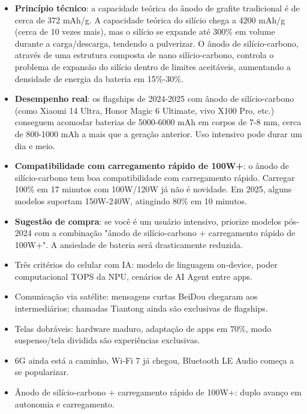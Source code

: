\begin{itemize}
  \item \textbf{Princípio técnico}: a capacidade teórica do ânodo de grafite tradicional é de cerca de 372 mAh/g. A capacidade teórica do silício chega a 4200 mAh/g (cerca de 10 vezes mais), mas o silício se expande até 300\% em volume durante a carga/descarga, tendendo a pulverizar. O ânodo de silício-carbono, através de uma estrutura composta de nano silício-carbono, controla o problema de expansão do silício dentro de limites aceitáveis, aumentando a densidade de energia da bateria em 15\%-30\%.
  \item \textbf{Desempenho real}: os flagships de 2024-2025 com ânodo de silício-carbono (como Xiaomi 14 Ultra, Honor Magic 6 Ultimate, vivo X100 Pro, etc.) conseguem acomodar baterias de 5000-6000 mAh em corpos de 7-8 mm, cerca de 800-1000 mAh a mais que a geração anterior. Uso intensivo pode durar um dia e meio.
  \item \textbf{Compatibilidade com carregamento rápido de 100W+}: o ânodo de silício-carbono tem boa compatibilidade com carregamento rápido. Carregar 100\% em 17 minutos com 100W/120W já não é novidade. Em 2025, alguns modelos suportam 150W-240W, atingindo 80\% em 10 minutos.
  \item \textbf{Sugestão de compra}: se você é um usuário intensivo, priorize modelos pós-2024 com a combinação "ânodo de silício-carbono + carregamento rápido de 100W+". A ansiedade de bateria será drasticamente reduzida.
\end{itemize}


\begin{itemize}
  \item Três critérios do celular com IA: modelo de linguagem on-device, poder computacional TOPS da NPU, cenários de AI Agent entre apps.
  \item Comunicação via satélite: mensagens curtas BeiDou chegaram aos intermediários; chamadas Tiantong ainda são exclusivas de flagships.
  \item Telas dobráveis: hardware maduro, adaptação de apps em 70\%, modo suspenso/tela dividida são experiências exclusivas.
  \item 6G ainda está a caminho, Wi-Fi 7 já chegou, Bluetooth LE Audio começa a se popularizar.
  \item Ânodo de silício-carbono + carregamento rápido de 100W+: duplo avanço em autonomia e carregamento.
\end{itemize}

